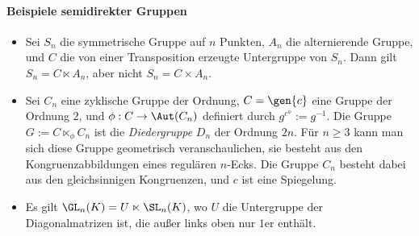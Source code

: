 \documentclass[12pt,a4paper,twoside]{article}
\newcommand{\ei}[1]{\emph{#1}\index{#1}}
\begin{document}
\paragraph{Beispiele semidirekter Gruppen}
\begin{itemize}
\item Sei $S_n$ die symmetrische Gruppe auf $n$ Punkten, $A_n$ die
  alternierende Gruppe, und $C$ die von einer Transposition erzeugte
  Untergruppe von $S_n$. Dann gilt $S_n=C\ltimes A_n$, aber nicht $S_n=C\times
  A_n$.
\item Sei $C_n$ eine zyklische Gruppe der Ordnung, $C=\gen{c}$ eine Gruppe der
  Ordnung $2$, und $\phi:C\to\Aut(C_n)$ definiert durch
  $g^{c^\phi}:=g^{-1}$. Die Gruppe $G:=C\ltimes_\phi C_n$ ist die
  \ei{Diedergruppe} $D_n$ der Ordnung $2n$. F\"ur $n\ge3$ kann man sich diese
  Gruppe geometrisch veranschaulichen, sie besteht aus den
  Kongruenzabbildungen eines regul\"aren $n$-Ecks. Die Gruppe $C_n$ besteht
  dabei aus den gleichsinnigen Kongruenzen, und $c$ ist eine Spiegelung.
\item Es gilt $\GL_n(K)=U\ltimes \SL_n(K)$, wo $U$ die Untergruppe der
  Diagonalmatrizen ist, die au\ss er links oben nur $1$er enth\"alt.
\end{itemize}
\end{document}
